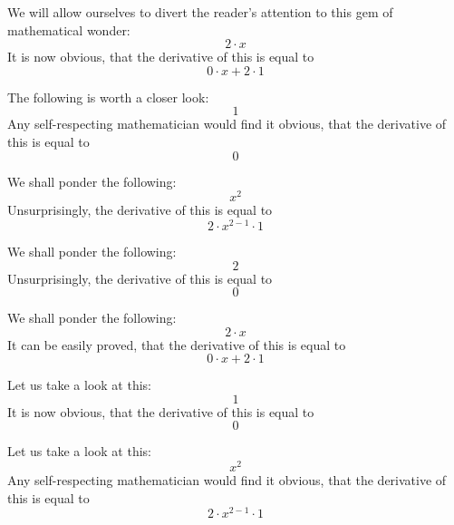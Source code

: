 \documentclass{article}
\begin{document}
We will allow ourselves to divert the reader's attention to this gem of mathematical wonder:
\begin{equation}
2 \cdot x 
\end{equation}
It is now obvious, that the derivative of this is equal to
\begin{equation}
0 \cdot x + 2 \cdot 1 
\end{equation}

The following is worth a closer look:
\begin{equation}
1 
\end{equation}
Any self-respecting mathematician would find it obvious, that the derivative of this is equal to
\begin{equation}
0 
\end{equation}

We shall ponder the following:
\begin{equation}
x ^{2 } 
\end{equation}
Unsurprisingly, the derivative of this is equal to
\begin{equation}
2 \cdot x ^{2 - 1 } \cdot 1 
\end{equation}

We shall ponder the following:
\begin{equation}
2 
\end{equation}
Unsurprisingly, the derivative of this is equal to
\begin{equation}
0 
\end{equation}

We shall ponder the following:
\begin{equation}
2 \cdot x 
\end{equation}
It can be easily proved, that the derivative of this is equal to
\begin{equation}
0 \cdot x + 2 \cdot 1 
\end{equation}

Let us take a look at this:
\begin{equation}
1 
\end{equation}
It is now obvious, that the derivative of this is equal to
\begin{equation}
0 
\end{equation}

Let us take a look at this:
\begin{equation}
x ^{2 } 
\end{equation}
Any self-respecting mathematician would find it obvious, that the derivative of this is equal to
\begin{equation}
2 \cdot x ^{2 - 1 } \cdot 1 
\end{equation}
\end{document}
